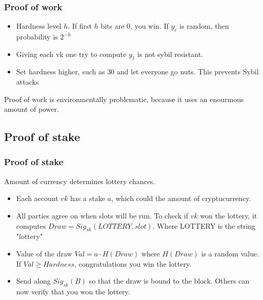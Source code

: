     \begin{frame}
        \frametitle{Proof of work}
            \begin{itemize}
                \item Hardness level $h$. If first $h$ bits are $0$, you win. If $y_c$ is random, then probability is $2^{-h}$ 
                \item Giving each vk one try to compute $y_1$ is not sybil resistant. 
                \item Set hardness higher, such as $30$ and let everyone go nuts. This prevents Sybil attacks
            \end{itemize}
            Proof of work is environmentally problematic, because it uses an enourmous amount of power. 
    \end{frame}

    \subsection{Proof of stake}
        \begin{frame}
            \frametitle{Proof of stake}
                Amount of currency determines lottery chances.
                \begin{itemize}
                   \item Each account $vk$ has a stake $a$, which could the amount of cryptucurrency. 
                   \item All parties agree on when slots will be run. To check if $vk$ won the lottery, it computes $Draw = Sig_{sk}(LOTTERY, slot)$. Where LOTTERY is the string "lottery"
                   \item Value of the draw $Val = a \cdot H(Draw)$ where $H(Draw)$ is a random value. If $Val \geq Hardness$, congratulations you win the lottery. 
                   \item Send along $Sig_{sk}(B)$ so that the draw is bound to the block. Others can now verify that you won the lottery.  
                \end{itemize}
        
        \end{frame}

